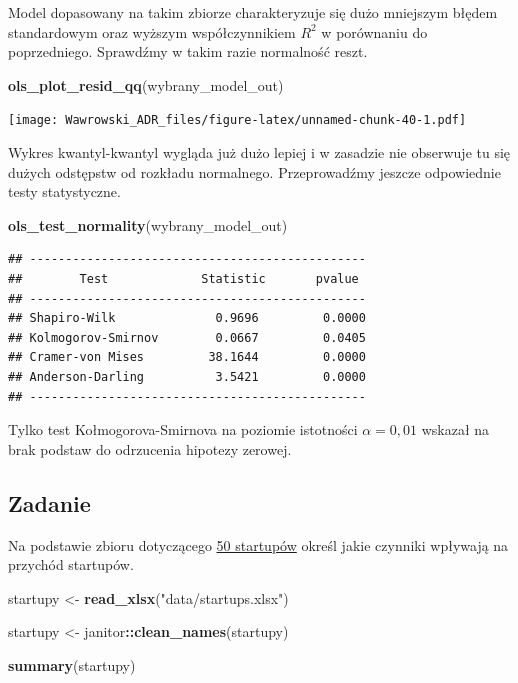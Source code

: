 \documentclass[
]{book}
\newenvironment{Shaded}{\begin{snugshade}}{\end{snugshade}}
\newcommand{\KeywordTok}[1]{\textcolor[rgb]{0.13,0.29,0.53}{\textbf{#1}}}
\newcommand{\NormalTok}[1]{#1}
\newcommand{\OperatorTok}[1]{\textcolor[rgb]{0.81,0.36,0.00}{\textbf{#1}}}
\newcommand{\StringTok}[1]{\textcolor[rgb]{0.31,0.60,0.02}{#1}}
\begin{document}
Model dopasowany na takim zbiorze charakteryzuje się dużo mniejszym błędem standardowym oraz wyższym współczynnikiem \(R^2\) w porównaniu do poprzedniego. Sprawdźmy w takim razie normalność reszt.

\begin{Shaded}
\begin{Highlighting}[]
\KeywordTok{ols_plot_resid_qq}\NormalTok{(wybrany_model_out)}
\end{Highlighting}
\end{Shaded}

\texttt{[image: Wawrowski\_ADR\_files/figure-latex/unnamed-chunk-40-1.pdf]}

Wykres kwantyl-kwantyl wygląda już dużo lepiej i w zasadzie nie obserwuje tu się dużych odstępstw od rozkładu normalnego. Przeprowadźmy jeszcze odpowiednie testy statystyczne.

\begin{Shaded}
\begin{Highlighting}[]
\KeywordTok{ols_test_normality}\NormalTok{(wybrany_model_out)}
\end{Highlighting}
\end{Shaded}

\begin{verbatim}
## -----------------------------------------------
##        Test             Statistic       pvalue  
## -----------------------------------------------
## Shapiro-Wilk              0.9696         0.0000 
## Kolmogorov-Smirnov        0.0667         0.0405 
## Cramer-von Mises         38.1644         0.0000 
## Anderson-Darling          3.5421         0.0000 
## -----------------------------------------------
\end{verbatim}

Tylko test Kołmogorova-Smirnova na poziomie istotności \(\alpha=0,01\) wskazał na brak podstaw do odrzucenia hipotezy zerowej.

\hypertarget{zadanie-1}{%
\subsection{Zadanie}\label{zadanie-1}}

Na podstawie zbioru dotyczącego \href{data/startups.xlsx}{50 startupów} określ jakie czynniki wpływają na przychód startupów.

\begin{Shaded}
\begin{Highlighting}[]
\NormalTok{startupy <-}\StringTok{ }\KeywordTok{read_xlsx}\NormalTok{(}\StringTok{"data/startups.xlsx"}\NormalTok{)}

\NormalTok{startupy <-}\StringTok{ }\NormalTok{janitor}\OperatorTok{::}\KeywordTok{clean_names}\NormalTok{(startupy)}

\KeywordTok{summary}\NormalTok{(startupy)}
\end{Highlighting}
\end{Shaded}
\end{document}
